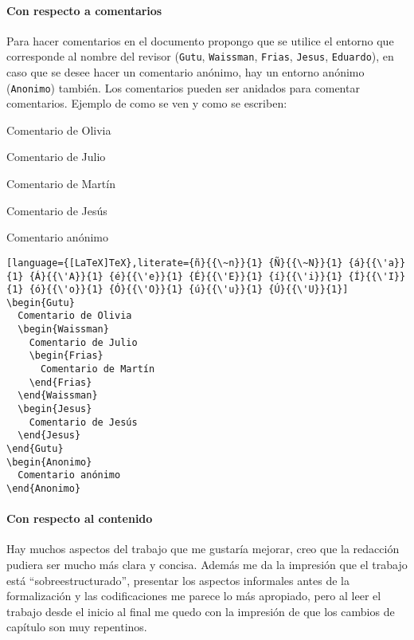 \paragraph{Con respecto a comentarios} Para hacer comentarios en el documento propongo que se utilice el entorno que corresponde al nombre del revisor (\texttt{Gutu}, \texttt{Waissman}, \texttt{Frias}, \texttt{Jesus}, \texttt{Eduardo}), en caso que se desee hacer un comentario anónimo, hay un entorno anónimo (\texttt{Anonimo}) también. Los comentarios pueden ser anidados para comentar comentarios. Ejemplo de como se ven y como se escriben:
\begin{Gutu}
  Comentario de Olivia
  \begin{Waissman}
    Comentario de Julio
    \begin{Frias}
      Comentario de Martín
    \end{Frias}
  \end{Waissman}
  \begin{Jesus}
    Comentario de Jesús
  \end{Jesus}
\end{Gutu}
\begin{Anonimo}
  Comentario anónimo
\end{Anonimo}

\begin{lstlisting}[language={[LaTeX]TeX},literate={ñ}{{\~n}}{1} {Ñ}{{\~N}}{1} {á}{{\'a}}{1} {Á}{{\'A}}{1} {é}{{\'e}}{1} {É}{{\'E}}{1} {í}{{\'i}}{1} {Í}{{\'I}}{1} {ó}{{\'o}}{1} {Ó}{{\'O}}{1} {ú}{{\'u}}{1} {Ú}{{\'U}}{1}]
\begin{Gutu}
  Comentario de Olivia
  \begin{Waissman}
    Comentario de Julio
    \begin{Frias}
      Comentario de Martín
    \end{Frias}
  \end{Waissman}
  \begin{Jesus}
    Comentario de Jesús
  \end{Jesus}
\end{Gutu}
\begin{Anonimo}
  Comentario anónimo
\end{Anonimo}
\end{lstlisting}

\paragraph{Con respecto al contenido} Hay muchos aspectos del trabajo que me gustaría mejorar, creo que la redacción pudiera ser mucho más clara y concisa. Además me da la impresión que el trabajo está ``sobreestructurado'', presentar los aspectos informales antes de la formalización y las codificaciones me parece lo más apropiado, pero al leer el trabajo desde el inicio al final me quedo con la impresión de que los cambios de capítulo son muy repentinos.

